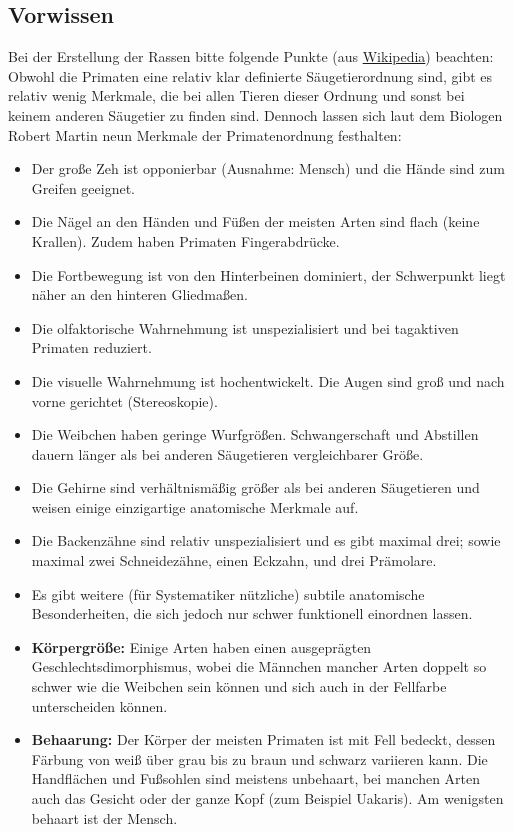 \subsection{Vorwissen}
Bei der Erstellung der Rassen bitte folgende Punkte (aus \href{https://de.m.wikipedia.org/wiki/Primaten#Merkmale}{Wikipedia}) beachten:\\
Obwohl die Primaten eine relativ klar definierte Säugetierordnung sind, gibt es relativ wenig Merkmale, die bei allen Tieren dieser Ordnung und sonst bei keinem anderen Säugetier zu finden sind. Dennoch lassen sich laut dem Biologen Robert Martin neun Merkmale der Primatenordnung festhalten:
\begin{itemize}
	\item Der große Zeh ist opponierbar (Ausnahme: Mensch) und die Hände sind zum Greifen geeignet.
	\item Die Nägel an den Händen und Füßen der meisten Arten sind flach (keine Krallen). Zudem haben Primaten Fingerabdrücke.
	\item Die Fortbewegung ist von den Hinterbeinen dominiert, der Schwerpunkt liegt näher an den hinteren Gliedmaßen.
	\item Die olfaktorische Wahrnehmung ist unspezialisiert und bei tagaktiven Primaten reduziert.
	\item Die visuelle Wahrnehmung ist hochentwickelt. Die Augen sind groß und nach vorne gerichtet (Stereoskopie).
	\item Die Weibchen haben geringe Wurfgrößen. Schwangerschaft und Abstillen dauern länger als bei anderen Säugetieren vergleichbarer Größe.
	\item Die Gehirne sind verhältnismäßig größer als bei anderen Säugetieren und weisen einige einzigartige anatomische Merkmale auf.
	\item Die Backenzähne sind relativ unspezialisiert und es gibt maximal drei; sowie maximal zwei Schneidezähne, einen Eckzahn, und drei Prämolare.
	\item Es gibt weitere (für Systematiker nützliche) subtile anatomische Besonderheiten, die sich jedoch nur schwer funktionell einordnen lassen.
	\item \textbf{Körpergröße:} Einige Arten haben einen ausgeprägten Geschlechtsdimorphismus, wobei die Männchen mancher Arten doppelt so schwer wie die Weibchen sein können und sich auch in der Fellfarbe unterscheiden können. 
	\item \textbf{Behaarung:} Der Körper der meisten Primaten ist mit Fell bedeckt, dessen Färbung von weiß über grau bis zu braun und schwarz variieren kann. Die Handflächen und Fußsohlen sind meistens unbehaart, bei manchen Arten auch das Gesicht oder der ganze Kopf (zum Beispiel Uakaris). Am wenigsten behaart ist der Mensch. 

\end{itemize}
